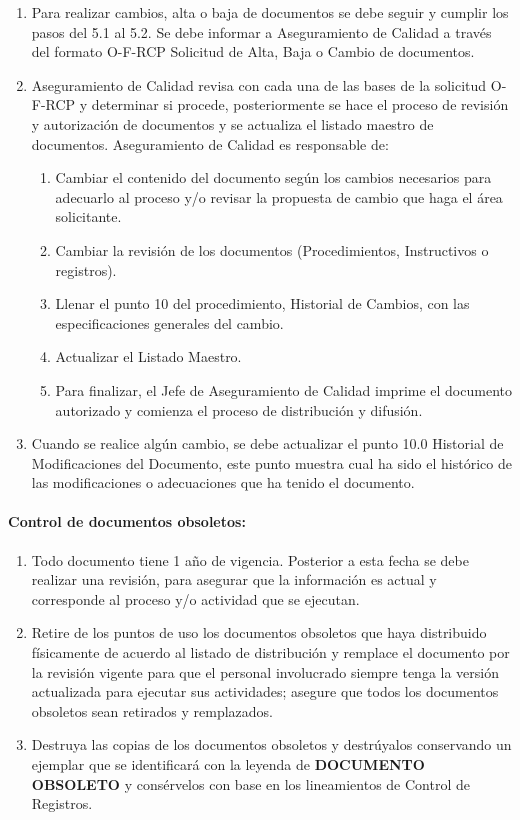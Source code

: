 \begin{enumerate}
	\item Para realizar cambios, alta o baja de documentos se debe seguir y cumplir los pasos del 5.1 al 5.2. Se debe informar a Aseguramiento de Calidad a través del formato O-F-RCP Solicitud de Alta, Baja o Cambio de documentos.
	\item Aseguramiento de Calidad revisa con cada una de las bases de la solicitud O-F-RCP y determinar si procede, posteriormente se hace el proceso de revisión y autorización de documentos y se actualiza el listado maestro de documentos. Aseguramiento de Calidad es responsable de:
	\begin{enumerate}
		\item Cambiar el contenido del documento según los cambios necesarios para adecuarlo al proceso y/o revisar la propuesta de cambio que haga el área solicitante.
		\item Cambiar la revisión de los documentos (Procedimientos, Instructivos o registros).
		\item Llenar el punto 10 del procedimiento, Historial de Cambios, con las especificaciones generales del cambio.
		\item Actualizar el Listado Maestro.
		\item Para finalizar, el Jefe de Aseguramiento de Calidad imprime el documento autorizado y comienza el proceso de distribución y difusión.
	\end{enumerate}
	\item Cuando se realice algún cambio, se debe actualizar el punto 10.0 Historial de Modificaciones del Documento, este punto muestra cual ha sido el histórico de las modificaciones o adecuaciones que ha tenido el documento.
\end{enumerate}

\paragraph{Control de documentos obsoletos:}

\begin{enumerate}
	\item Todo documento tiene 1 año de vigencia. Posterior a esta fecha se debe realizar una revisión, para asegurar que la información es actual y corresponde al proceso y/o actividad que se ejecutan.
	\item Retire de los puntos de uso los documentos obsoletos que haya distribuido físicamente de acuerdo al listado de distribución y remplace el documento por la revisión vigente para que el personal involucrado siempre tenga la versión actualizada para ejecutar sus actividades; asegure que todos los documentos obsoletos sean retirados y remplazados.
	\item Destruya las copias de los documentos obsoletos y destrúyalos conservando un ejemplar que se identificará con la leyenda de \textbf{DOCUMENTO OBSOLETO} y consérvelos con base en los lineamientos de Control de Registros.
\end{enumerate}

